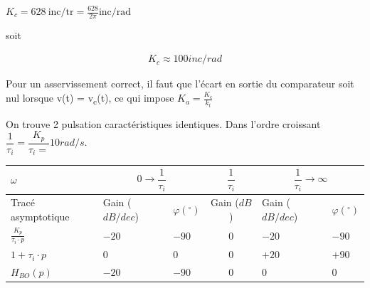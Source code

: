 
\begin{texteCache}

  \(K_{c} = 628\ \text{inc}/\text{tr} = \frac{628}{2\pi}\text{inc}/\text{rad}\)
  
soit

\begin{align*}
K_{c} \approx 100 inc/rad
\end{align*}


  Pour un asservissement correct, il faut que l'écart en sortie du
  comparateur soit nul lorsque v(t) = v\textsubscript{c}(t), ce qui
  impose \(K_{a} = \frac{K_{c}}{k_{t}}\)


\end{texteCache}



\begin{texteCache}
\renewcommand{\arraystretch}{3}

On trouve 2 pulsation caractéristiques identiques. Dans l'ordre croissant $\dfrac{1}{\tau_i}=\dfrac{K_p}{\tau_i=}10 rad/s$.




\begin{center}
\begin{tabular}{|p{}|p{}|p{}|c|p{}|p{}|}
\hline 
$\omega$& \multicolumn{2}{c|}{$0 \to \dfrac{1}{\tau_i}$}   & $\dfrac{1}{\tau_i}$ &  \multicolumn{2}{c|}{$\dfrac{1}{\tau_i}\to \infty$}\\ 
\hline 
Tracé asymptotique &  Gain ($dB/dec$) & $\varphi (^\circ)$ & Gain ($dB$) & Gain ($dB/dec$) & $\varphi (^\circ)$  \\ 
\hline 
$\frac{K_{p}}{\tau_i \cdot p}$ & $-20$ & $-90$ & $0$ & $-20$ & $-90$  \\ 
\hline 
$1+\tau_i\cdot p$ & $0$ & $0$ & $0$ & $+20$ & $+90$  \\ 
\hline 
\hline
$H_{BO}(p)$ & $-20$ & $-90$ & $0$ & $0$ & $0$   \\ 
\hline 
\end{tabular} 
\end{center}
\end{texteCache}



